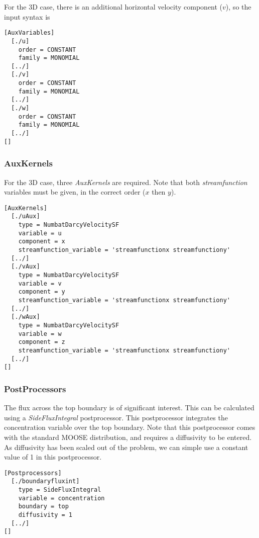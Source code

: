\documentclass[11pt, a4paper]{csiroreport2012}
\begin{document}
For the 3D case, there is an additional horizontal velocity component ($v$), so the input syntax is
\begin{shaded}
\begin{verbatim}
[AuxVariables]
  [./u]
    order = CONSTANT
    family = MONOMIAL
  [../]
  [./v]
    order = CONSTANT
    family = MONOMIAL
  [../]
  [./w]
    order = CONSTANT
    family = MONOMIAL
  [../]
[]
\end{verbatim}
\end{shaded}

\subsubsection*{AuxKernels}

For the 3D case, three \emph{AuxKernels} are required. Note that both \emph{streamfunction} variables must be given, in the correct order ($x$ then $y$). 
\begin{shaded}
\begin{verbatim}
[AuxKernels]
  [./uAux]
    type = NumbatDarcyVelocitySF
    variable = u
    component = x
    streamfunction_variable = 'streamfunctionx streamfunctiony'
  [../]
  [./vAux]
    type = NumbatDarcyVelocitySF
    variable = v
    component = y
    streamfunction_variable = 'streamfunctionx streamfunctiony'
  [../]
  [./wAux]
    type = NumbatDarcyVelocitySF
    variable = w
    component = z
    streamfunction_variable = 'streamfunctionx streamfunctiony'
  [../]
[]
\end{verbatim}
\end{shaded}

\subsubsection*{PostProcessors}

The flux across the top boundary is of significant interest. This can be calculated using a \emph{SideFluxIntegral} postprocessor. This postprocessor integrates the concentration variable over the top boundary. Note that this postprocessor comes with the standard MOOSE distribution, and requires a diffusivity to be entered. As diffusivity has been scaled out of the problem, we can simple use a constant value of 1 in this postprocessor.

\begin{shaded}
\begin{verbatim}
[Postprocessors]
  [./boundaryfluxint]
    type = SideFluxIntegral
    variable = concentration
    boundary = top
    diffusivity = 1
  [../]
[]
\end{verbatim}
\end{shaded}
\end{document}
